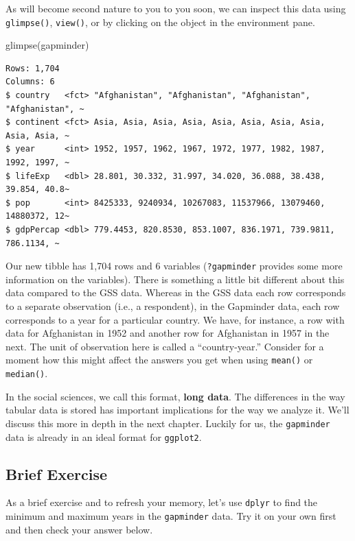\documentclass[
  letterpaper,
]{book}
\newenvironment{Shaded}{\begin{snugshade}}{\end{snugshade}}
\newcommand{\FunctionTok}[1]{\textcolor[rgb]{0.28,0.35,0.67}{#1}}
\newcommand{\NormalTok}[1]{\textcolor[rgb]{0.00,0.23,0.31}{#1}}
\begin{document}
As will become second nature to you to you soon, we can inspect this
data using \texttt{glimpse()}, \texttt{view()}, or by clicking on the
object in the environment pane.

\begin{Shaded}
\begin{Highlighting}[]
\FunctionTok{glimpse}\NormalTok{(gapminder)}
\end{Highlighting}
\end{Shaded}

\begin{verbatim}
Rows: 1,704
Columns: 6
$ country   <fct> "Afghanistan", "Afghanistan", "Afghanistan", "Afghanistan", ~
$ continent <fct> Asia, Asia, Asia, Asia, Asia, Asia, Asia, Asia, Asia, Asia, ~
$ year      <int> 1952, 1957, 1962, 1967, 1972, 1977, 1982, 1987, 1992, 1997, ~
$ lifeExp   <dbl> 28.801, 30.332, 31.997, 34.020, 36.088, 38.438, 39.854, 40.8~
$ pop       <int> 8425333, 9240934, 10267083, 11537966, 13079460, 14880372, 12~
$ gdpPercap <dbl> 779.4453, 820.8530, 853.1007, 836.1971, 739.9811, 786.1134, ~
\end{verbatim}

Our new tibble has 1,704 rows and 6 variables (\texttt{?gapminder}
provides some more information on the variables). There is something a
little bit different about this data compared to the GSS data. Whereas
in the GSS data each row corresponds to a separate observation (i.e., a
respondent), in the Gapminder data, each row corresponds to a year for a
particular country. We have, for instance, a row with data for
Afghanistan in 1952 and another row for Afghanistan in 1957 in the next.
The unit of observation here is called a ``country-year.'' Consider for
a moment how this might affect the answers you get when using
\texttt{mean()} or \texttt{median()}.

In the social sciences, we call this format, \textbf{long data}. The
differences in the way tabular data is stored has important implications
for the way we analyze it. We'll discuss this more in depth in the next
chapter. Luckily for us, the \texttt{gapminder} data is already in an
ideal format for \texttt{ggplot2}.

\hypertarget{brief-exercise}{%
\subsection*{Brief Exercise}\label{brief-exercise}}

As a brief exercise and to refresh your memory, let's use \texttt{dplyr}
to find the minimum and maximum years in the \texttt{gapminder} data.
Try it on your own first and then check your answer below.
\end{document}

